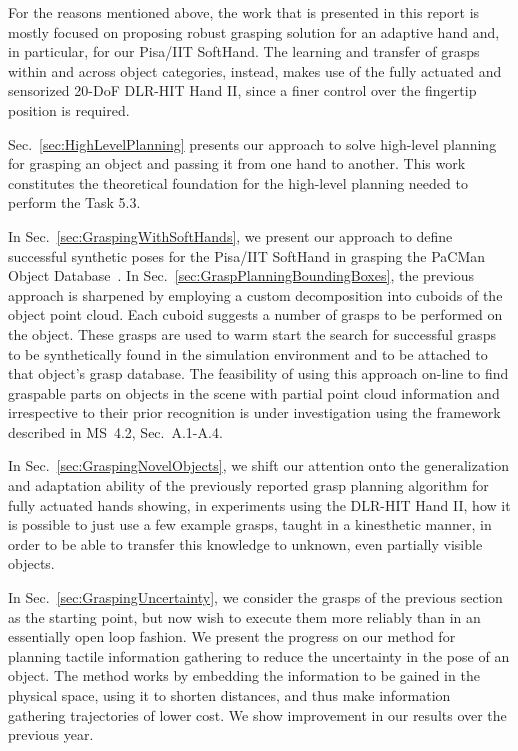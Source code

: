 \documentclass[a4paper,11pt,pdf]{pacmanreport}
\begin{document}
For the reasons mentioned above, the work that is presented in this report is mostly focused on proposing robust grasping solution for an adaptive hand and, in particular, for our Pisa/IIT SoftHand. The learning and transfer of grasps within and across object categories, instead, makes use of the fully actuated and sensorized 20-DoF DLR-HIT Hand II, since a finer control over the fingertip position is required.

Sec.~\ref{sec:HighLevelPlanning} presents our approach to solve high-level planning for grasping an object and passing it from one hand to another. This work constitutes the theoretical foundation for the high-level planning needed to perform the Task 5.3.

In Sec.~\ref{sec:GraspingWithSoftHands}, we present our approach to define successful synthetic poses for the Pisa/IIT SoftHand in grasping the PaCMan Object Database~\cite{PacmanObjectDatabase}. In Sec.~\ref{sec:GraspPlanningBoundingBoxes}, the previous approach is sharpened by employing a custom decomposition into cuboids of the object point cloud. Each cuboid suggests a number of grasps to be performed on the object. These grasps are used to warm start the search for successful grasps to be synthetically found in the simulation environment and to be attached to that object's grasp database. The feasibility of using this approach on-line to find graspable parts on objects in the scene with partial point cloud information and irrespective to their prior recognition is under investigation using the framework described in MS~4.2, Sec.~A.1-A.4.

In Sec.~\ref{sec:GraspingNovelObjects}, we shift our attention onto the generalization and adaptation ability of the previously reported grasp planning algorithm for fully actuated hands showing, in experiments using the DLR-HIT Hand II, how it is possible to just use a few example grasps, taught in a kinesthetic manner, in order to be able to transfer this knowledge to unknown, even partially visible objects.

In Sec.~\ref{sec:GraspingUncertainty}, we consider the grasps of the previous section as the starting point, but now wish to execute them more reliably than in an essentially open loop fashion. We present the progress on our method for planning tactile information gathering to reduce the uncertainty in the pose of an object. The method works by embedding the information to be gained in the physical space, using it to shorten distances, and thus make information gathering trajectories of lower cost. We show improvement in our results over the previous year.
\end{document}
